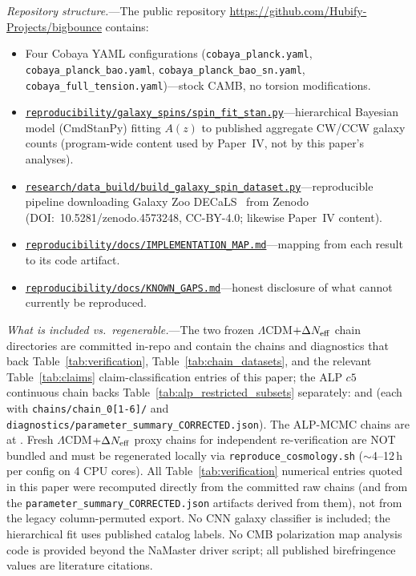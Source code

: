 \documentclass[aps,prd,twocolumn,superscriptaddress,showpacs,preprintnumbers,nofootinbib,longbibliography,floatfix]{revtex4-2}
\newcommand{\Neff}{N_{\rm eff}}
\newcommand{\repoBase}{https://github.com/Hubify-Projects/bigbounce/blob/main}
\providecommand{\artifact}[1]{\href{\repoBase/#1}{\nolinkurl{#1}}}
\begin{document}
\textit{Repository structure.}---The public repository
\url{https://github.com/Hubify-Projects/bigbounce}
contains:
\begin{itemize}[leftmargin=*]
\item Four Cobaya YAML configurations (\texttt{cobaya\_planck.yaml},
\texttt{cobaya\_planck\_bao.yaml}, \texttt{cobaya\_planck\_bao\_sn.yaml},
\texttt{cobaya\_full\_tension.yaml})---stock CAMB, no torsion modifications.
\item \artifact{reproducibility/galaxy\_spins/spin\_fit\_stan.py}---hierarchical Bayesian model
(CmdStanPy) fitting $A(z)$ to published aggregate CW/CCW galaxy counts
(program-wide content used by Paper~IV, not by this paper's analyses).
\item \artifact{research/data\_build/build\_galaxy\_spin\_dataset.py}---reproducible pipeline
downloading Galaxy Zoo DECaLS~\cite{Walmsley2022} from Zenodo
(DOI:~10.5281/zenodo.4573248, CC-BY-4.0; likewise Paper~IV content).
\item \artifact{reproducibility/docs/IMPLEMENTATION\_MAP.md}---mapping from each result to its
code artifact.
\item \artifact{reproducibility/docs/KNOWN\_GAPS.md}---honest disclosure of what cannot currently
be reproduced.
\end{itemize}

\textit{What is included vs.\ regenerable.}---The two frozen
$\Lambda$CDM$+\Delta\Neff$ chain directories are committed
in-repo and contain the chains and diagnostics that back
Table~\ref{tab:verification}, Table~\ref{tab:chain_datasets}, and the relevant
Table~\ref{tab:claims} claim-classification entries
of this paper; the ALP $c5$ continuous chain backs Table~\ref{tab:alp_restricted_subsets} separately:
 and
(each with \texttt{chains/chain\_0[1-6]/} and
\texttt{diagnostics/}\allowbreak\texttt{parameter\_summary\_CORRECTED.json}). The
ALP-MCMC chains are at
.
Fresh $\Lambda$CDM$+\Delta\Neff$ proxy chains for independent
re-verification are NOT bundled and must be regenerated locally via
\texttt{reproduce\_cosmology.sh} ($\sim$4--12\,h per config on 4 CPU cores).
All Table~\ref{tab:verification} numerical entries quoted in this paper were recomputed
directly from the committed raw chains (and from the
\texttt{parameter\_summary\_CORRECTED.json} artifacts derived from
them), not from the legacy column-permuted export.
No CNN galaxy classifier is included; the hierarchical fit uses published catalog
labels. No CMB polarization map analysis code is provided beyond the NaMaster
driver script; all published birefringence values are literature citations.
\end{document}
